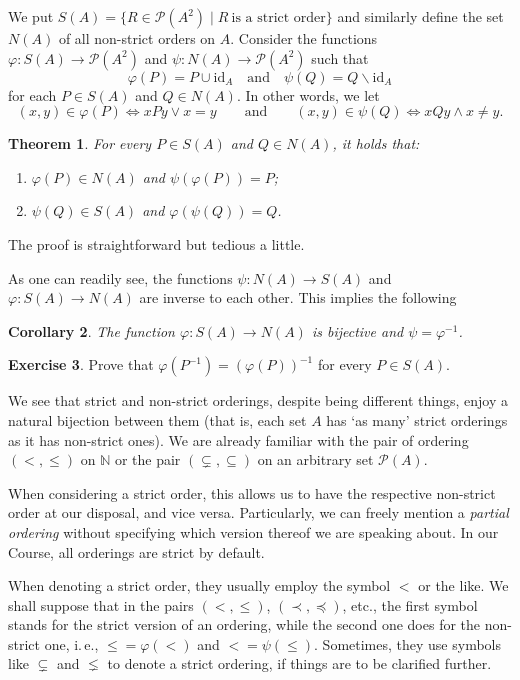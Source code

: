 \documentclass[12pt,notitlepage]{article}
\theoremstyle{plain}
\newtheorem{thm}{Theorem}[section]
\newtheorem{corr}[thm]{Corollary}
\theoremstyle{definition}
\newtheorem{exc}[thm]{Exercise}
\theoremstyle{plain}
\newcommand{\N}{\mathbb{N}}
\newcommand{\sbs}{\subseteq}
\renewcommand{\setminus}{\smallsetminus}
\newcommand{\mP}{\mathcal{P}}
\renewcommand{\phi}{\varphi}
\newcommand{\id}{\mathrm{id}}
\newcommand{\1}{\mathbf{1}}
\newcommand{\0}{\mathbf{0}}
\begin{document}
We put $S(A) = \{ R \in \mP(A^2) \mid R\ \mbox{is a strict order} \}$
and similarly define the set $N(A)$ of all non-strict orders on $A$. Consider the functions $\phi\colon S(A) \to \mP(A^2)$ and $\psi\colon N(A) \to \mP(A^2)$ such that
$$\phi(P) = P \cup \id_A\quad \mbox{and}\quad \psi(Q) = Q \setminus \id_A$$
for each $P \in S(A)$ and $Q \in N(A)$. In other words, we let
$$
(x,y) \in \phi(P) \iff xPy \vee x = y\qquad \mbox{and}\qquad
(x,y) \in \psi(Q) \iff xQy \wedge x \neq y.
$$

\begin{thm} For every $P \in S(A)$ and $Q \in N(A)$, it holds that:
\begin{enumerate}
\item $\phi(P) \in N(A)$ and $\psi(\phi(P)) = P$;
\item $\psi(Q) \in S(A)$ and $\phi(\psi(Q)) = Q$.
\end{enumerate}
\end{thm}
\noindent The proof is straightforward but tedious a little.

As one can readily see, the functions $\psi\colon N(A) \to S(A)$ and $\phi\colon S(A) \to N(A)$ are inverse to each other. This implies the following
\begin{corr}
The function $\phi\colon S(A) \to N(A)$ is bijective and $\psi = \phi^{-1}$.
\end{corr}
\begin{exc}
Prove that $\phi(P^{-1}) = (\phi(P))^{-1}$ for every $P \in S(A)$.
\end{exc}

We see that strict and non-strict orderings, despite being different things, enjoy a natural bijection between them (that is, each set $A$ has `as many' strict orderings as it has non-strict ones). We are already familiar with the pair of ordering $({<},{\leq})$ on $\N$ or the pair $({\subsetneq},{\sbs})$ on an arbitrary set $\mP(A)$.

When considering a strict order, this allows us to have the respective non-strict order at our disposal, and vice versa. Particularly, we can freely mention a \emph{partial ordering} without specifying which version thereof we are speaking about. In our Course, all orderings are strict by default.

When denoting a strict order, they usually employ the symbol ${<}$ or the like. We shall suppose that in the pairs $({<},{\leq})$, $({\prec}, {\preceq})$, etc., the first symbol stands for the strict version of an ordering, while the second one does for the non-strict one, i.\,e., ${\leq} = \phi({<})$ and ${<} = \psi({\leq})$. Sometimes, they use symbols like ${\subsetneq}$ and ${\lneq}$ to denote a strict ordering, if things are to be clarified further.
\end{document}

